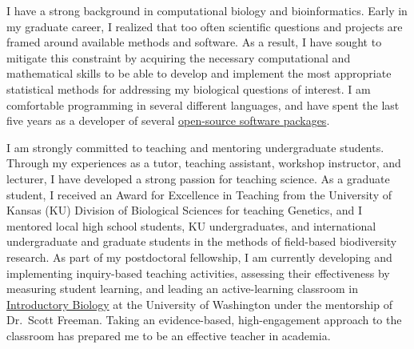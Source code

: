 \documentclass[letterpaper, 10pt]{letter}
\begin{document}
\begin{letter}
I have a strong background in computational biology and bioinformatics.
Early in my graduate career, I realized that too often scientific questions and
projects are framed around available methods and software.
As a result, I have sought to mitigate this constraint by acquiring the
necessary computational and mathematical skills to be able to develop and
implement the most appropriate statistical methods for addressing my biological
questions of interest.
I am comfortable programming in several different languages, and have spent the
last five years as a developer of several
\href{http://www.phyletica.com/?page_id=249}{open-source software packages}.

I am strongly committed to teaching and mentoring undergraduate
students.
Through my experiences as a tutor, teaching assistant, workshop instructor,
and lecturer, I have developed a strong passion for teaching science.
As a graduate student, I received an Award for Excellence in Teaching from the
University of Kansas (KU) Division of Biological Sciences for teaching
Genetics, and I mentored local high school students, KU undergraduates, and
international undergraduate and graduate students in the methods of field-based
biodiversity research.
As part of my postdoctoral fellowship, I am currently developing and
implementing inquiry-based teaching activities, assessing their effectiveness
by measuring student learning, and leading an active-learning classroom in
\href{http://courses.biology.washington.edu/biol180/}{Introductory Biology} at
the University of Washington under the mentorship of Dr.\ Scott Freeman.
Taking an evidence-based, high-engagement approach to the classroom has
prepared me to be an effective teacher in academia.




\end{letter}
\end{document}
